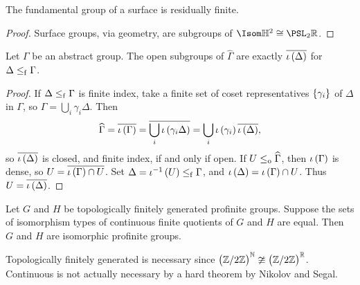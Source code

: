 \begin{proposition}
The fundamental group of a surface is residually finite.
\end{proposition}

\begin{proof}
Surface groups, via geometry, are subgroups of $ \Isom \HH^2 \cong \PSL_2 \RR $.
\end{proof}

\pagebreak

\begin{lemma}
Let $ \Gamma $ be an abstract group. The open subgroups of $ \widehat{\Gamma} $ are exactly $ \overline{\iota\br{\Delta}} $ for $ \Delta \le_{\mathrm{f}} \Gamma $.
\end{lemma}

\begin{proof}
If $ \Delta \le_{\mathrm{f}} \Gamma $ is finite index, take a finite set of coset representatives $ \cbr{\gamma_i} $ of $ \Delta $ in $ \Gamma $, so $ \Gamma = \bigcup_i \gamma_i\Delta $. Then
$$ \widehat{\Gamma} = \overline{\iota\br{\Gamma}} = \overline{\bigcup_i \iota\br{\gamma_i\Delta}} = \bigcup_i \iota\br{\gamma_i}\overline{\iota\br{\Delta}}, $$
so $ \overline{\iota\br{\Delta}} $ is closed, and finite index, if and only if open. If $ U \le_{\mathrm{o}} \widehat{\Gamma} $, then $ \iota\br{\Gamma} $ is dense, so $ U = \overline{\iota\br{\Gamma} \cap U} $. Set $ \Delta = \iota^{-1}\br{U} \le_\f \Gamma $, and $ \iota\br{\Delta} = \iota\br{\Gamma} \cap U $. Thus $ U = \overline{\iota\br{\Delta}} $.
\end{proof}

\begin{theorem}
Let $ G $ and $ H $ be topologically finitely generated profinite groups. Suppose the sets of isomorphism types of continuous finite quotients of $ G $ and $ H $ are equal. Then $ G $ and $ H $ are isomorphic profinite groups.
\end{theorem}

Topologically finitely generated is necessary since $ \br{\ZZ / 2\ZZ}^\NN \ncong \br{\ZZ / 2\ZZ}^\RR $. Continuous is not actually necessary by a hard theorem by Nikolov and Segal.


